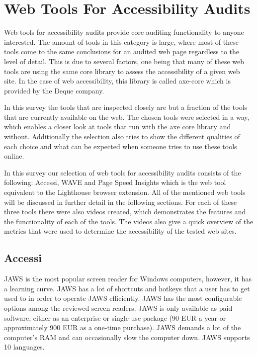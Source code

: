 %
%
% 
% 
% 


\chapter{Web Tools For Accessibility Audits}

\label{chap:WebTools}



Web tools for accessibility audits provide core auditing functionality to anyone interested. The amount of tools in this category is large, where most of these tools come to the same conclusions for an audited web page regardless to the level of detail. This is due to several factors, one being that many of these web tools are using the same core library to assess the accessibility of a given web site. In the case of web accessibility, this library is called axe-core which is provided by the Deque company.

In this survey the tools that are inspected closely are but a fraction of the tools that are currently available on the web. The chosen tools were selected in a way, which enables a closer look at tools that run with the axe core library and without. Additionally the selection also tries to show the different qualities of each choice and what can be expected when someone tries to use these tools online.

In this survey our selection of web tools for accessibility audits consists of the following: Accessi, WAVE and Page Speed Insights which is the web tool equivalent to the Lighthouse browser extension. All of the mentioned web tools will be discussed in further detail in the following sections. For each of these three tools there were also videos created, which demonstrates the features and the functionality of each of the tools. The videos also give a quick overview of the metrics that were used to determine the accessibility of the tested web sites. 

\section{Accessi}
JAWS is the most popular screen reader for Windows computers, however, it has a learning curve. JAWS has a lot of shortcuts and hotkeys that a user has to get used to in order to operate JAWS efficiently. JAWS has the most configurable options among the reviewed screen readers. JAWS is only available as paid software, either as an enterprise or single-use package (90 EUR a year or approximately 900 EUR as a one-time purchase). JAWS demands a lot of the computer's RAM and can occasionally slow the computer down. JAWS supports 10 languages.

